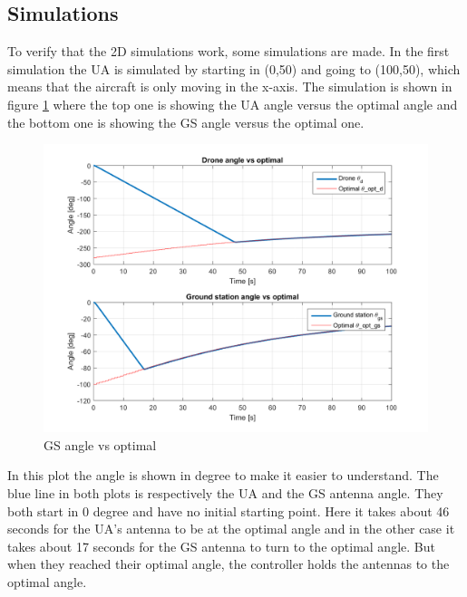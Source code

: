 \subsection{Simulations}
To verify that the 2D simulations work, some simulations are made. In the first simulation the UA is simulated by starting in (0,50) and going to (100,50), which means that the aircraft is only moving in the x-axis. The simulation is shown in figure \ref{fig:gs_angle_vs_optimal} where the top one is showing the UA angle versus the optimal angle and the bottom one is showing the GS angle versus the optimal one. 

\begin{figure}[h]
	\centering
	\includegraphics[scale=0.6]{figures/gs_angle_vs_optimal.png}
	\caption{GS angle vs optimal}
	\label{fig:gs_angle_vs_optimal}
\end{figure}

In this plot the angle is shown in degree to make it easier to understand. The blue line in both plots is respectively the UA and the GS antenna angle. They both start in 0 degree and have no initial starting point. Here it takes about 46 seconds for the UA's antenna to be at the optimal angle and in the other case it takes about 17 seconds for the GS antenna to turn to the optimal angle. But when they reached their optimal angle, the controller holds the antennas to the optimal angle. 
\newpage
